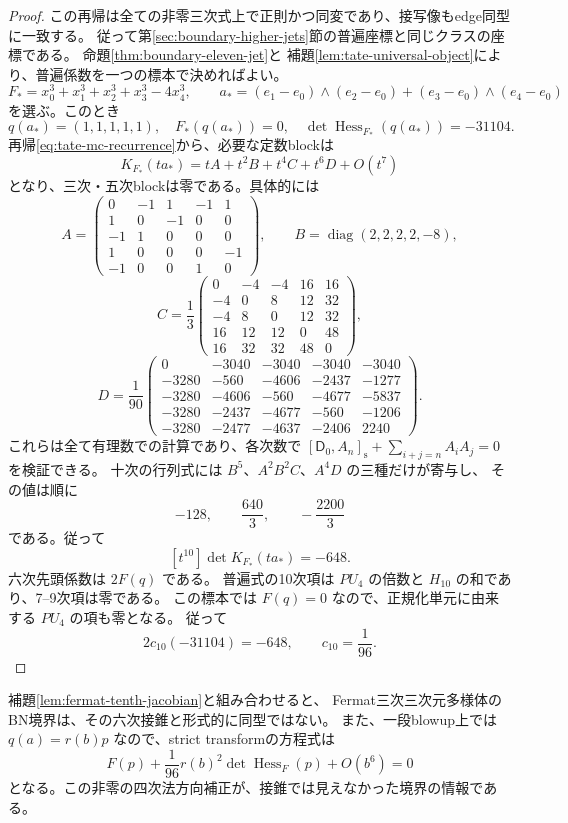 \begin{proof}
この再帰は全ての非零三次式上で正則かつ同変であり、接写像もedge同型に一致する。
従って第\ref{sec:boundary-higher-jets}節の普遍座標と同じクラスの座標である。
命題\ref{thm:boundary-eleven-jet}と
補題\ref{lem:tate-universal-object}により、普遍係数を一つの標本で決めればよい。
\[
 F_*=x_0^3+x_1^3+x_2^3+x_3^3-4x_4^3,\qquad
 a_*=(e_1-e_0)\wedge(e_2-e_0)+(e_3-e_0)\wedge(e_4-e_0)
\]
を選ぶ。このとき
\[
 q(a_*)=(1,1,1,1,1),\quad F_*(q(a_*))=0,\quad
 \det\operatorname{Hess}_{F_*}(q(a_*))=-31104.
\]
再帰\eqref{eq:tate-mc-recurrence}から、必要な定数blockは
\[
 K_{F_*}(t a_*)=tA+t^2B+t^4C+t^6D+O(t^7)
\]
となり、三次・五次blockは零である。具体的には
\[
 A=\begin{pmatrix}
 0&-1&1&-1&1\\1&0&-1&0&0\\-1&1&0&0&0\\
 1&0&0&0&-1\\-1&0&0&1&0
 \end{pmatrix},\qquad
 B=\operatorname{diag}(2,2,2,2,-8),
\]
\[
 C=\frac13\begin{pmatrix}
 0&-4&-4&16&16\\-4&0&8&12&32\\-4&8&0&12&32\\
 16&12&12&0&48\\16&32&32&48&0
 \end{pmatrix},
\]
\[
 D=\frac1{90}\begin{pmatrix}
 0&-3040&-3040&-3040&-3040\\
 -3280&-560&-4606&-2437&-1277\\
 -3280&-4606&-560&-4677&-5837\\
 -3280&-2437&-4677&-560&-1206\\
 -3280&-2477&-4637&-2406&2240
 \end{pmatrix}.
\]
これらは全て有理数での計算であり、各次数で
$[\mathsf D_0,A_n]_{\mathrm s}+\sum_{i+j=n}A_iA_j=0$ を検証できる。
十次の行列式には $B^5$、$A^2B^2C$、$A^4D$ の三種だけが寄与し、
その値は順に
\[
                    -128,\qquad\frac{640}{3},\qquad-\frac{2200}{3}
\]
である。従って
\[
                  [t^{10}]\det K_{F_*}(ta_*)=-648.
\]
六次先頭係数は $2F(q)$ である。
普遍式の10次項は $P U_4$ の倍数と $H_{10}$ の和であり、7--9次項は零である。
この標本では $F(q)=0$ なので、正規化単元に由来する $P U_4$ の項も零となる。
従って
\[
           2c_{10}(-31104)=-648,\qquad c_{10}=\frac1{96}.
\]
\end{proof}

補題\ref{lem:fermat-tenth-jacobian}と組み合わせると、
Fermat三次三次元多様体のBN境界は、その六次接錐と形式的に同型ではない。
また、一段blowup上では $q(a)=r(b)p$ なので、strict transformの方程式は
\[
 F(p)+\frac1{96}r(b)^2\det\operatorname{Hess}_F(p)+O(b^6)=0
\]
となる。この非零の四次法方向補正が、接錐では見えなかった境界の情報である。

